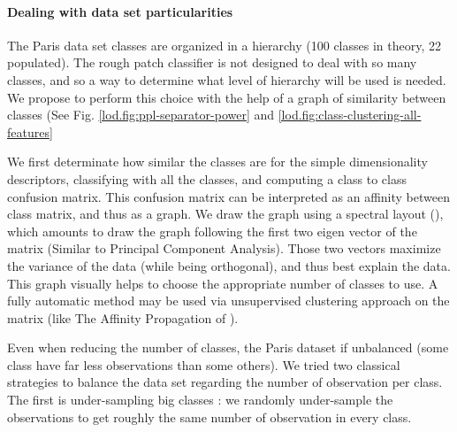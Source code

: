 		\paragraph{Dealing with data set particularities}
		The Paris data set classes are organized in a hierarchy (100 classes in theory, 22 populated).
		The rough patch classifier is not designed to deal with so many classes,
		and so a way to determine what level of hierarchy will be used is needed.
		We propose to perform this choice with the help of a graph of similarity between classes (See Fig. \ref{lod.fig:ppl-separator-power} and \ref{lod.fig:class-clustering-all-features}

		\label{lod.method.classification.spectral_layout}
		We first determinate how similar the classes are for the simple dimensionality descriptors, classifying with all the classes, and computing a class to class confusion matrix.
		This confusion matrix can be interpreted as an affinity between class matrix, and thus as a graph.
		We draw the graph using a spectral layout (\cite{Networkx2014}),
		 which amounts to draw the graph following the first two eigen vector of the matrix (Similar to Principal Component Analysis).
		Those two vectors maximize the variance of the data (while being orthogonal), and thus best explain the data.
		This graph visually helps to choose the appropriate number of classes to use.
		A fully automatic method may be used via unsupervised clustering approach on the matrix 
		(like The Affinity Propagation of \cite{Frey2007}).
		
		Even when reducing the number of classes, the Paris dataset if unbalanced (some class have far less observations than some others).
		We tried two classical strategies to balance the data set regarding the number of observation per class.
		The first is under-sampling big classes : we randomly under-sample the observations to get roughly the same number of observation in every class.
		
